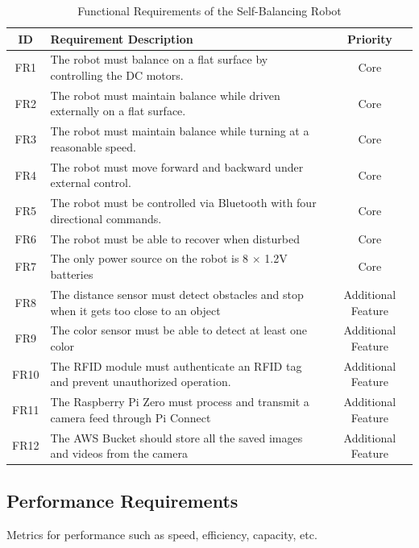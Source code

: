 \documentclass{article}
\begin{document}
\begin{table}[H]
    \centering
    \renewcommand{\arraystretch}{1.3} %
    \begin{tabularx}{\textwidth}{|c|X|c|}
        \hline
        \textbf{ID} & \textbf{Requirement Description} & \textbf{Priority} \\
        \hline
        FR1 & The robot must balance on a flat surface by controlling the DC motors. & Core \\
        \hline
        FR2 & The robot must maintain balance while driven externally on a flat surface. & Core \\
        \hline
        FR3 & The robot must maintain balance while turning at a reasonable speed. & Core \\
        \hline
        FR4 & The robot must move forward and backward under external control. & Core \\
        \hline
        FR5 & The robot must be controlled via Bluetooth with four directional commands. & Core \\
        \hline
        FR6 & The robot must be able to recover when disturbed & Core \\
        \hline
        FR7 & The only power source on the robot is 8 $\times$ 1.2V batteries & Core \\
        \hline
        FR8 & The distance sensor must detect obstacles and stop when it gets too close to an object & Additional Feature \\
        \hline
        FR9 & The color sensor must be able to detect at least one color & Additional Feature \\
        \hline
        FR10 & The RFID module must authenticate an RFID tag and prevent unauthorized operation. & Additional Feature \\
        \hline
        FR11 & The Raspberry Pi Zero must process and transmit a camera feed through Pi Connect & Additional Feature \\
        \hline
        FR12 & The AWS Bucket should store all the saved images and videos from the camera & Additional Feature \\
        \hline
    \end{tabularx}
    \caption{Functional Requirements of the Self-Balancing Robot}
    \label{tab:functional_requirements}
\end{table}

\subsection{Performance Requirements}
Metrics for performance such as speed, efficiency, capacity, etc.
\end{document}
